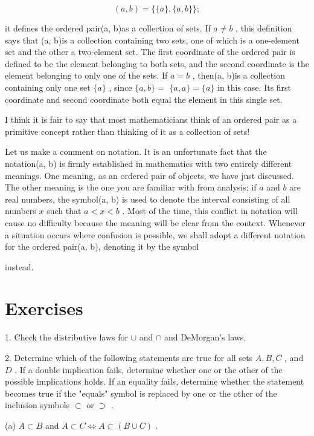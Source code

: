 \[
\left( {a,b}\right)  = \{ \{ a\} ,\{ a,b\} \} ;
\]

it defines the ordered pair(a, b)as a collection of sets. If \(a \neq  b\) , this definition says that (a, b)is a collection containing two sets, one of which is a one-element set and the other a two-element set. The first coordinate of the ordered pair is defined to be the element belonging to both sets, and the second coordinate is the element belonging to only one of the sets. If \(a = b\) , then(a, b)is a collection containing only one set \(\{ a\}\) , since \(\{ a,b\}  =\)  \(\{ a,a\}  = \{ a\}\) in this case. Its first coordinate and second coordinate both equal the element in this single set.

I think it is fair to say that most mathematicians think of an ordered pair as a primitive concept rather than thinking of it as a collection of sets!

Let us make a comment on notation. It is an unfortunate fact that the notation(a, b) is firmly established in mathematics with two entirely different meanings. One meaning, as an ordered pair of objects, we have just discussed. The other meaning is the one you are familiar with from analysis; if \(a\) and \(b\) are real numbers, the symbol(a, b) is used to denote the interval consisting of all numbers \(x\) such that \(a < x < b\) . Most of the time, this conflict in notation will cause no difficulty because the meaning will be clear from the context. Whenever a situation occurs where confusion is possible, we shall adopt a different notation for the ordered pair(a, b), denoting it by the symbol

instead.

\section*{Exercises}

1. Check the distributive laws for \(\cup\) and \(\cap\) and DeMorgan’s laws.

2. Determine which of the following statements are true for all sets \(A,B,C\) , and \(D\) . If a double implication fails, determine whether one or the other of the possible implications holds. If an equality fails, determine whether the statement becomes true if the "equals" symbol is replaced by one or the other of the inclusion symbols \(\subset\) or \(\supset\) .

(a) \(A \subset  B\) and \(A \subset  C \Leftrightarrow  A \subset  \left( {B \cup  C}\right)\) .

